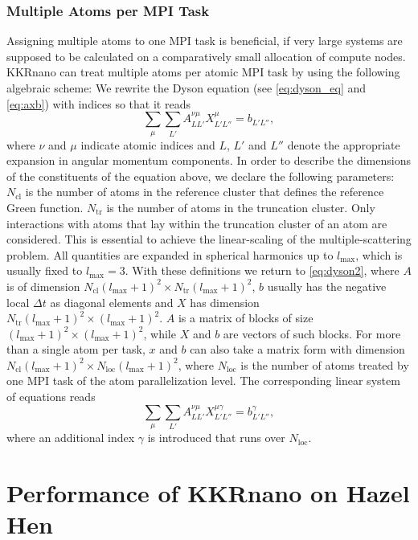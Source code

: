 \documentclass[graybox]{svmult}
\newcommand{\beq}{\begin{equation}}
\newcommand{\eeq}{\end{equation}}
\begin{document}
\subsubsection*{Multiple Atoms per MPI Task}

Assigning multiple atoms to one MPI task is beneficial, if very large systems are
supposed to be calculated on a comparatively small allocation of compute nodes.
KKRnano can treat multiple atoms per atomic MPI task by using the following algebraic scheme: 
We rewrite the Dyson equation (see \cref{eq:dyson_eq} and \cref{eq:axb}) with indices so that it reads
\beq
\sum_{\mu} \sum_{L'} A^{\nu \mu}_{LL'} X^{\mu}_{L'L''} = b_{L'L''},
\label{eq:dyson2}
\eeq
where $\nu$ and $\mu$ indicate atomic indices and $L$, $L'$ and $L''$ denote
the appropriate expansion in angular momentum components.
In order to describe the dimensions of the constituents of the equation above, we
declare the following parameters:
$N_{\text{cl}}$ is the number of atoms in the reference cluster that defines the reference Green function.
$N_{\text{tr}}$ is the number of atoms in the truncation cluster. Only interactions with atoms that lay 
within the truncation cluster of an atom are considered. This is essential to achieve
the linear-scaling of the multiple-scattering problem. 
All quantities are expanded in spherical harmonics up to $l_{\text{max}}$, which is usually fixed to
$l_{\text{max}}=3$.
With these definitions we return to \cref{eq:dyson2}, where $A$ is of dimension 
$N_{\text{cl}} (l_{\text{max}}+1)^2 \times N_{\text{tr}} (l_{\text{max}}+1)^2$,
$b$ usually has the
negative local $\Delta t$ as diagonal elements
and $X$ has dimension $N_{\text{tr}} (l_{\text{max}}+1)^2 \times (l_{\text{max}}+1)^2$.
$A$ is a matrix of blocks of size ${(l_{\text{max}}+1)}^2 \times {(l_{\text{max}}+1)}^2$,
while $X$ and $b$ are vectors
of such blocks. For more than a single atom per task, $x$ and $b$ can also take a matrix form
with dimension $N_{\text{cl}} (l_{\text{max}}+1)^2 \times N_{\text{loc}} (l_{\text{max}}+1)^2$, where
$N_{\text{loc}}$ is the number of atoms treated by one MPI task of the atom parallelization level.
The corresponding linear system of equations reads
\beq
\label{eq:dyson_equation_lap_multi}
\sum_{\mu} \sum_{L'} A^{\nu \mu}_{LL'} X^{\mu \gamma}_{L'L''} = b^{\gamma}_{L'L''},
\eeq
where an additional index $\gamma$ is introduced that runs over $N_{\text{loc}}$. 


\section{Performance of KKRnano on Hazel Hen}
\label{sec:performance}
\end{document}
